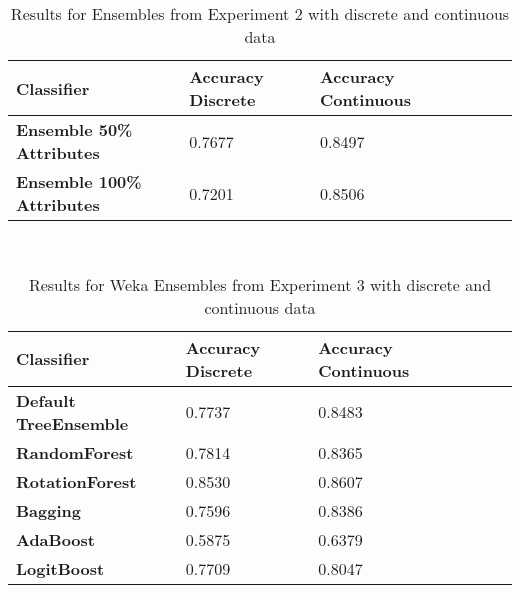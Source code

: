 \documentclass{cmppgr}
\begin{document}
\begin{table}[!h]
  \centering
  \scriptsize
  \caption{Results for Ensembles from Experiment 2 with discrete and continuous data}
  \begin{tabular}{|p{2cm}|p{2cm}|p{2cm}| p{2cm} |p{2cm}| p{2cm}|}
  \hline \bf Classifier & \bf Accuracy Discrete  & \bf Accuracy Continuous \\ [10pt]

  \hline \bf Ensemble 50\% Attributes & 0.7677 & 0.8497 \\ [10pt]
  \hline \bf Ensemble 100\% Attributes  & 0.7201 & 0.8506 \\ [10pt]
  \hline
  \end{tabular} \\
\end{table}

\begin{table}[!h]
  \centering
  \scriptsize
  \caption{Results for Weka Ensembles from Experiment 3 with discrete and continuous data}
  \begin{tabular}{|p{2cm}|p{2cm}|p{2cm}| p{2cm} |p{2cm}| p{2cm}|}
  \hline \bf Classifier & \bf Accuracy Discrete  &\bf  Accuracy Continuous \\ [10pt]

  \hline \bf Default TreeEnsemble & 0.7737 & 0.8483 \\ [10pt]
  \hline \bf RandomForest & 0.7814 & 0.8365 \\ [10pt]
  \hline \bf RotationForest & 0.8530 & 0.8607 \\ [10pt]
  \hline \bf Bagging & 0.7596 & 0.8386 \\ [10pt]
  \hline \bf AdaBoost & 0.5875 & 0.6379 \\ [10pt]
  \hline \bf LogitBoost  & 0.7709 & 0.8047 \\ [10pt]
  \hline
  \end{tabular} \\
\end{table}
\end{document}

